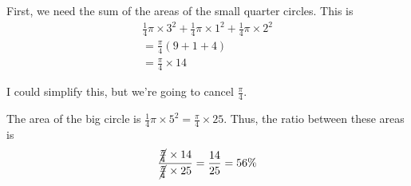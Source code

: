 \documentclass[a4paper]{article}
\newcommand{\qpi}{\frac{1}{4}\pi}
\newcommand{\pif}{\frac{\pi}{4}}
\begin{document}
First, we need the sum of the areas of the small quarter circles. This is
\begin{gather*}
\qpi \times 3^2 + \qpi \times 1^2 + \qpi \times 2^2\\
= \pif (9 + 1 + 4)\\
= \pif \times 14
\end{gather*}

I could simplify this, but we're going to cancel $\pif$.

The area of the big circle is $\qpi \times 5^2 = \pif \times 25$. Thus, the ratio between these areas is $$\frac{\cancel{\pif} \times 14}{\cancel{\pif} \times 25} = \frac{14}{25} = 56\%$$
\end{document}
